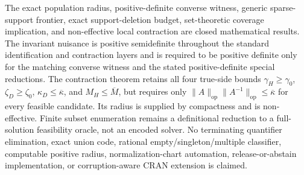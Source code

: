 The exact population radius, positive-definite converse witness, generic sparse-support frontier, exact support-deletion budget, set-theoretic coverage implication, and non-effective local contraction are closed mathematical results. The invariant nuisance is positive semidefinite throughout the standard identification and contraction layers and is required to be positive definite only for the matching converse witness and the stated positive-definite special reductions. The contraction theorem retains all four true-side bounds \(\gamma_H\geq\gamma_0\), \(\zeta_D\geq\zeta_0\), \(\kappa_D\leq\overline\kappa\), and \(M_H\leq\overline M\), but requires only \(\|A\|_{\mathrm{op}}\|A^{-1}\|_{\mathrm{op}}\leq\overline\kappa\) for every feasible candidate. Its radius is supplied by compactness and is non-effective. Finite subset enumeration remains a definitional reduction to a full-solution feasibility oracle, not an encoded solver. No terminating quantifier elimination, exact union code, rational empty/singleton/multiple classifier, computable positive radius, normalization-chart automation, release-or-abstain implementation, or corruption-aware CRAN extension is claimed.